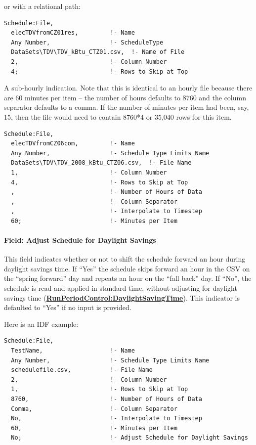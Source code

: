 or with a relational path:

\begin{lstlisting}
Schedule:File,
  elecTDVfromCZ01res,         !- Name
  Any Number,                 !- ScheduleType
  DataSets\TDV\TDV_kBtu_CTZ01.csv,  !- Name of File
  2,                          !- Column Number
  4;                          !- Rows to Skip at Top
\end{lstlisting}

A sub-hourly indication. Note that this is identical to an hourly file because there are 60 minutes per item -- the number of hours defaults to 8760 and the column separator defaults to a comma. If the number of minutes per item had been, say, 15, then the file would need to contain 8760*4 or 35,040 rows for this item.

\begin{lstlisting}
Schedule:File,
  elecTDVfromCZ06com,         !- Name
  Any Number,                 !- Schedule Type Limits Name
  DataSets\TDV\TDV_2008_kBtu_CTZ06.csv,  !- File Name
  1,                          !- Column Number
  4,                          !- Rows to Skip at Top
  ,                           !- Number of Hours of Data
  ,                           !- Column Separator
  ,                           !- Interpolate to Timestep
  60;                         !- Minutes per Item
\end{lstlisting}

\paragraph{Field: Adjust Schedule for Daylight Savings}\label{adjust-schedule-for-daylight-savings-1}

This field indicates whether or not to shift the schedule forward an hour during daylight savings time. If ``Yes'' the schedule skips forward an hour in the CSV on the ``spring forward'' day and repeats an hour on the ``fall back'' day. If  ``No'', the schedule is read and applied in standard time, without adjusting for daylight savings time (\textbf{\hyperref[runperiodcontroldaylightsavingtime]{RunPeriodControl:DaylightSavingTime}}). This indicator is defaulted to ``Yes'' if no input is provided.

Here is an IDF example:

\begin{lstlisting}
Schedule:File,
  TestName,                   !- Name
  Any Number,                 !- Schedule Type Limits Name
  schedulefile.csv,           !- File Name
  2,                          !- Column Number
  1,                          !- Rows to Skip at Top
  8760,                       !- Number of Hours of Data
  Comma,                      !- Column Separator
  No,                         !- Interpolate to Timestep
  60,                         !- Minutes per Item
  No;                         !- Adjust Schedule for Daylight Savings
\end{lstlisting}

